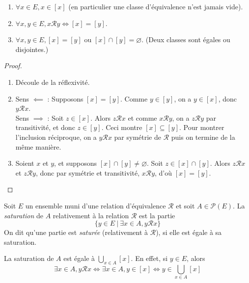 \begin{proposition}
\begin{enumerate}
\item $\forall x\in E, x\in [x]$ (en particulier une classe d'équivalence n'est jamais vide).
\item $\forall x, y\in E, x{\mathcal R}y \iff [x]=[y]$.
\item $\forall x, y\in E, [x] = [y] \text{ ou } [x]\cap [y]=\varnothing$. (Deux classes sont égales ou disjointes.)
\end{enumerate}
\end{proposition}
\begin{proof}
\begin{enumerate}
\item Découle de la réflexivité.
\item Sens $\impliedby$ : Supposons $[x]=[y]$. Comme $y\in [y]$, on a $y\in [x]$, donc $y{\mathcal R}x$.\\
Sens $\implies$ : Soit $z\in [x]$. Alors $z{\mathcal R}x$ et comme $x{\mathcal R}y$, on a $z{\mathcal R}y$ par transitivité, et donc $z\in [y]$. Ceci montre $[x]\subseteq [y]$. Pour montrer l'inclusion réciproque, on a $y{\mathcal R}x$ par symétrie de $\mathcal R$ puis on termine de la même manière.
\item Soient $x$ et $y$, et supposons $[x]\cap [y] \neq \varnothing$. Soit $z\in [x]\cap [y]$. Alors $z\mathcal R x$ et $z\mathcal R y$, donc par symétrie et transitivité, $x\mathcal R y$, d'où $[x]=[y]$.
\end{enumerate}
\end{proof}

\begin{definition}
Soit $E$ un ensemble muni d'une relation d'équivalence ${\mathcal R}$ et soit $A\in \mathcal P(E)$. La \emph{saturation} de $A$ relativement à la relation $\mathcal R$ est la partie
\[
\{y\in E\:|\: \exists x\in A, y\mathcal R x\} 
\]
On dit qu'une partie est \emph{saturée} (relativement à $\mathcal R$), si elle est égale à sa saturation.
\end{definition}

\begin{remarque} La saturation de $A$ est égale à $\bigcup_{x\in A} [x]$. En effet, si $y\in E$, alors 
\[
\exists x\in A, y\mathcal R x
\iff \exists x\in A, y\in [x]
\iff y\in \bigcup_{x\in A} [x]
\]
\end{remarque}

